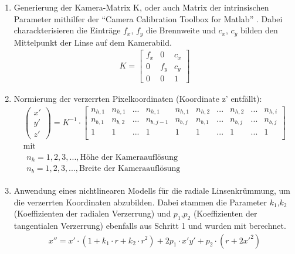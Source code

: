 \begin{enumerate}
	\item Generierung der Kamera-Matrix K, oder auch Matrix der intrinsischen Parameter mithilfer der "`Camera Calibration Toolbox for Matlab"' \citep{Calib}. Dabei charackterisieren die Einträge $f_x$, $f_y$ die Brennweite und $c_x$, $c_y$ bilden den Mittelpunkt der Linse  auf dem Kamerabild.
	\begin{align*}
	K = \begin{bmatrix}
	f_x &  0 & c_x\\ 
	0 & f_y & c_y\\ 
	0 & 0 & 1
	\end{bmatrix}
	\end{align*}  
	\item Normierung der verzerrten Pixelkoordinaten (Koordinate z' entfällt): 
	\setcounter{MaxMatrixCols}{20} 
	\begin{gather*}
	\begin{pmatrix} x'\\ y'\\ z' \end{pmatrix} = K^{-1} \cdot 
	\begin{bmatrix}
	n_{h,1} & n_{h,1} & ... & n_{h,1} & n_{h,1} & n_{h,2} & ... & n_{h,2} & ... & n_{h,i}\\
	n_{b,1} & n_{b,2} & ... & n_{b,j-1} & n_{b,j} & n_{b,1} & ... & n_{b,j} & ... & n_{b,j}\\
	1 & 1 & ... & 1 & 1 & 1 & ... & 1 & ... & 1\\
	\end{bmatrix} \\[1mm] \text{mit} \\[1mm]
	\begin{matrix}
	n_{h} = 1,2,3,..., \text{Höhe der Kameraauflösung}\\ 
	n_{b} = 1,2,3,..., \text{Breite der Kameraauflösung}
	\end{matrix}
	\end{gather*}
	\item Anwendung eines nichtlinearen Modells für die radiale Linsenkrümmung, um die verzerrten Koordinaten abzubilden. Dabei stammen die Parameter $k_1$,$k_2$ (Koeffizienten der radialen Verzerrung) und  $p_1$,$p_2$ (Koeffizienten der tangentialen Verzerrung) ebenfalls aus Schritt 1 und wurden mit \citep{Calib} berechnet.
	\begin{gather*}
	{x}'' = x'\cdot \left ( 1+k_1\cdot r + k_2\cdot r^2 \right )+2 p_1\cdot x'y'+p_2\cdot \left ( r+2{x}'^2 \right )\\

\end{gather*}
\end{enumerate}
